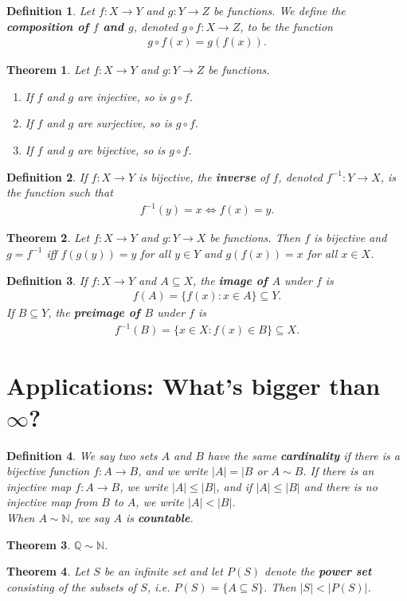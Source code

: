 \documentclass{article}
\theoremstyle{sltheorem}
\newtheorem{definition}{Definition}[section]
\newtheorem{theorem}{Theorem}[section]
\newcommand{\N}{\mathbb{N}}
\begin{document}
\begin{definition}
    Let $f:X\to Y$ and $g:Y\to Z$ be functions. We define the \textbf{composition of $f$ and $g$}, denoted $g\circ f:X\to Z$, to be the function
    \begin{align*}
        g\circ f(x) = g(f(x)).
    \end{align*}
\end{definition}
\begin{theorem}
    Let $f:X\to Y$ and $g:Y\to Z$ be functions.
    \begin{enumerate}
        \item If $f$ and $g$ are injective, so is $g\circ f$.
        \item If $f$ and $g$ are surjective, so is $g\circ f$.
        \item If $f$ and $g$ are bijective, so is $g\circ f$.
    \end{enumerate}
\end{theorem}
\begin{definition}
    If $f:X\to Y$ is bijective, the \textbf{inverse} of $f$, denoted $f^{-1}:Y\to X$, is the function such that
    \begin{align*}
        f^{-1}(y) = x \Leftrightarrow f(x) = y.
    \end{align*}
\end{definition}
\begin{theorem}
    Let $f:X\to Y$ and $g:Y\to X$ be functions. Then $f$ is bijective and $g=f^{-1}$ iff $f(g(y))= y$ for all $y\in Y$ and $g(f(x))=x$ for all $x\in X$.
\end{theorem}
\begin{definition}
    If $f:X\to Y$ and $A\subseteq X$, the \textbf{image of $A$} under $f$ is
    \begin{align*}
        f(A) = \{f(x):x\in A\}\subseteq Y.
    \end{align*}
    If $B\subseteq Y$, the \textbf{preimage of $B$} under $f$ is
    \begin{align*}
        f^{-1}(B) = \{x\in X:f(x)\in B\}\subseteq X.
    \end{align*}
\end{definition}
\section*{Applications: What's bigger than $\infty$?}
\begin{definition}
    We say two sets $A$ and $B$ have the same \textbf{cardinality} if there is a bijective function $f:A\to B$, and we write $|A|=|B$ or $A\sim B$. If there is an injective map $f:A\to B$, we write $|A|\leq |B|$, and if $|A|\leq |B|$ and there is no injective map from $B$ to $A$, we write $|A|<|B|$.\\
    When $A\sim\N$, we say $A$ is \textbf{countable}.
\end{definition}
\begin{theorem}
    $\mathbb{Q}\sim\N$.
\end{theorem}
\begin{theorem}
    Let $S$ be an infinite set and let $P(S)$ denote the \textbf{power set} consisting of the subsets of $S$, i.e. $P(S) = \{A\subseteq S\}$. Then $|S|<|P(S)|$.
\end{theorem}
\end{document}
